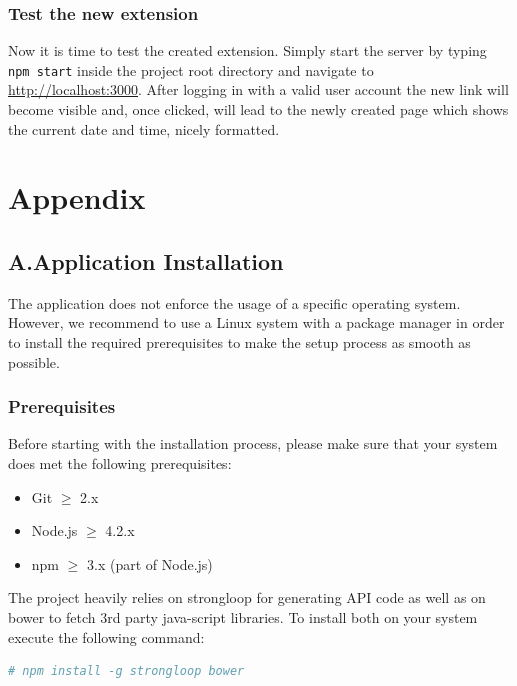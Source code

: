 \documentclass[nochapterpage,nopartpage,noheadingspace,numbersubsubsec,bigchapter,colorback,accentcolor=tud9c,10pt]{tudreport}
\begin{document}
  \section{Test the new extension}
  \label{sec:tech:handson:test}

    Now it is time to test the created extension. Simply start the server by typing \texttt{npm start} inside the project root directory and navigate to \url{http://localhost:3000}. After logging in with a valid user account the new link will become visible and, once clicked, will lead to the newly created page which shows the current date and time, nicely formatted.

\part{Appendix}
\label{part:appendix}

  \chapter*{A.\quad Application Installation}
  \label{ch:appendix:setup}

    The application does not enforce the usage of a specific operating system. However, we recommend to use a Linux system with a package manager in order to install the required prerequisites to make the setup process as smooth as possible.

  \section*{Prerequisites}
  \label{sec:appendix:setup:prerequisites}

    Before starting with the installation process, please make sure that your system does met the following prerequisites:
        \begin{multicols}{2}
        \begin{itemize}
            \item Git $\ge$ 2.x
            \item Node.js $\ge$ 4.2.x
            \item npm $\ge$ 3.x (part of Node.js)
        \end{itemize}
        \end{multicols}

    \noindent The project heavily relies on strongloop for generating API code as well as on bower to fetch 3rd party java-script libraries. To install both on your system execute the following command:
        \begin{lstlisting}[language=bash]
    # npm install -g strongloop bower
        \end{lstlisting}
\end{document}
